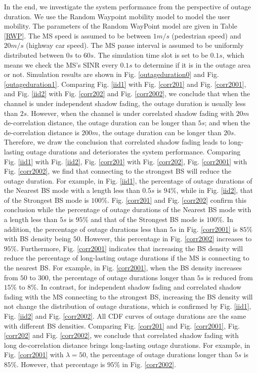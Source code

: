 \documentclass[journal,10pt]{IEEEtran}
\begin{document}
 \par In the end, we investigate the system performance from the perspective of outage duration. We use the Random Waypoint mobility model to model the user mobility. The parameters of the Random WayPoint model are given in Table \ref{RWP}. The MS speed is assumed to be between $1m/s$ (pedestrian speed) and $20m/s$ (highway car speed). The MS pause interval is assumed to be uniformly distributed between $0s$ to $60s$. The simulation time slot is set to be $0.1s$, which means we check the MS's SINR every $0.1s$ to determine if it is in the outage area or not. Simulation results are shown in Fig. \ref{outageduration0} and Fig. \ref{outageduration1}. Comparing Fig. \ref{iid1} with Fig. \ref{corr201} and Fig. \ref{corr2001}, and Fig. \ref{iid2} with Fig. \ref{corr202} and Fig. \ref{corr2002}, we conclude that when the channel is under independent shadow fading, the outage duration is usually less than $2s$. However,  when the channel is under correlated shadow fading with $20m$ de-correlation distance, the outage duration can be longer than $5s$; and when the de-correlation distance is $200m$, the outage duration can be longer than $20s$. Therefore, we draw the conclusion that correlated shadow fading leads to long-lasting outage durations and deteriorates the system performance. Comparing Fig. \ref{iid1} with Fig. \ref{iid2},  Fig. \ref{corr201} with Fig. \ref{corr202}, Fig. \ref{corr2001} with Fig. \ref{corr2002}, we find that connecting to the strongest BS will reduce the outage duration. For example, in Fig. \ref{iid1}, the percentage of outage durations of the Nearest BS mode with a length less than $0.5s$ is $94\%$, while in Fig. \ref{iid2}, that of the Strongest BS mode is $100\%$.  Fig. \ref{corr201} and Fig. \ref{corr202} confirm this conclusion while the percentage of outage durations of the Nearest BS mode with a length less than $5s$ is $95\%$ and that of the Strongest BS mode is $100\%$. In addition, the percentage of outage durations less than $5s$ in Fig. \ref{corr2001} is $85\%$ with BS density being $50$. However, this percentage in Fig. \ref{corr2002} increases to $95\%$. Furthermore, Fig. \ref{corr2001} indicates that increasing the BS density will reduce the percentage of long-lasting outage durations if the MS is connecting to the nearest BS. For example, in Fig. \ref{corr2001}, when the BS density increases from $50$ to $300$, the percentage of outage durations longer than $5s$ is reduced from $15\%$ to $8\%$. In contrast, for independent shadow fading and correlated shadow fading with the MS connecting to the strongest BS, increasing the BS density will not change the distribution of outage durations, which is confirmed by Fig. \ref{iid1}, Fig. \ref{iid2} and Fig. \ref{corr2002}. All CDF curves of outage durations are the same with different BS densities. Comparing Fig. \ref{corr201} and Fig. \ref{corr2001}, Fig. \ref{corr202} and Fig. \ref{corr2002}, we conclude that correlated shadow fading with long de-correlation distance brings long-lasting outage durations. For example, in Fig. \ref{corr2001} with $\lambda = 50$, the percentage of outage durations longer than $5s$ is $85\%$. However, that percentage is $95\%$ in Fig. \ref{corr2002}.
\end{document}
